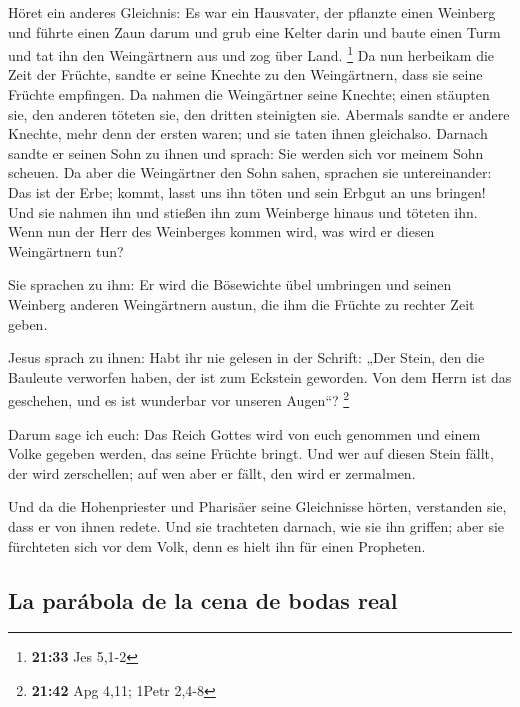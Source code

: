  Höret ein anderes Gleichnis: Es war ein Hausvater, der
pflanzte einen Weinberg und führte einen Zaun darum und grub eine Kelter
darin und baute einen Turm und tat ihn den Weingärtnern aus und zog über
Land. \footnote{\textbf{21:33} Jes 5,1-2}  Da nun
herbeikam die Zeit der Früchte, sandte er seine Knechte zu den
Weingärtnern, dass sie seine Früchte empfingen.  Da
nahmen die Weingärtner seine Knechte; einen stäupten sie, den anderen
töteten sie, den dritten steinigten sie.  Abermals sandte
er andere Knechte, mehr denn der ersten waren; und sie taten ihnen
gleichalso.  Darnach sandte er seinen Sohn zu ihnen und
sprach: Sie werden sich vor meinem Sohn scheuen.  Da aber
die Weingärtner den Sohn sahen, sprachen sie untereinander: Das ist der
Erbe; kommt, lasst uns ihn töten und sein Erbgut an uns bringen!
 Und sie nahmen ihn und stießen ihn zum Weinberge hinaus
und töteten ihn.  Wenn nun der Herr des Weinberges kommen
wird, was wird er diesen Weingärtnern tun?

 Sie sprachen zu ihm: Er wird die Bösewichte übel
umbringen und seinen Weinberg anderen Weingärtnern austun, die ihm die
Früchte zu rechter Zeit geben.

 Jesus sprach zu ihnen: Habt ihr nie gelesen in der
Schrift: „Der Stein, den die Bauleute verworfen haben, der ist zum
Eckstein geworden. Von dem Herrn ist das geschehen, und es ist wunderbar
vor unseren Augen``? \footnote{\textbf{21:42} Apg 4,11; 1Petr 2,4-8}

 Darum sage ich euch: Das Reich Gottes wird von euch
genommen und einem Volke gegeben werden, das seine Früchte bringt.
 Und wer auf diesen Stein fällt, der wird zerschellen;
auf wen aber er fällt, den wird er zermalmen.

 Und da die Hohenpriester und Pharisäer seine Gleichnisse
hörten, verstanden sie, dass er von ihnen redete.  Und
sie trachteten darnach, wie sie ihn griffen; aber sie fürchteten sich
vor dem Volk, denn es hielt ihn für einen Propheten.

\hypertarget{la-paruxe1bola-de-la-cena-de-bodas-real}{%
\subsection{La parábola de la cena de bodas
real}\label{la-paruxe1bola-de-la-cena-de-bodas-real}}

